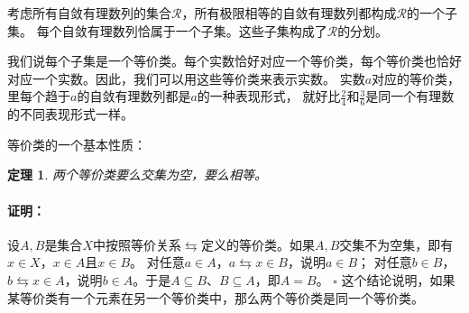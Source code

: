 \documentclass[12pt,UTF8]{ctexbook}
\newtheorem{tm}{定理}[section]
\newenvironment{proof2}{\paragraph{\textbf{证明：}}}{\hfill$\square$}
\begin{document}
\begin{appendix}
考虑所有自敛有理数列的集合$\mathcal{R}$，所有极限相等的自敛有理数列都构成$\mathcal{R}$的一个子集。
每个自敛有理数列恰属于一个子集。这些子集构成了$\mathcal{R}$的分划。

我们说每个子集是一个等价类。每个实数恰好对应一个等价类，每个等价类也恰好对应一个实数。因此，我们可以用这些等价类来表示实数。
实数$a$对应的等价类，里每个趋于$a$的自敛有理数列都是$a$的一种表现形式，
就好比$\frac{2}{4}$和$\frac{3}{6}$是同一个有理数的不同表现形式一样。

等价类的一个基本性质：
\begin{tm}\label{lm:a-1-10}
    两个等价类要么交集为空，要么相等。    
\end{tm}
\begin{proof2}
    设$A,B$是集合$X$中按照等价关系$\leftrightarrows$定义的等价类。如果$A,B$交集不为空集，即有$x\in X$，$x\in A$且$x\in B$。
    对任意$a\in A$，$a\leftrightarrows x\in B$，说明$a\in B$；
    对任意$b\in B$，$b\leftrightarrows x\in A$，说明$b\in A$。于是$A\subseteq B$、$B\subseteq A$，即$A = B$。
\end{proof2}
这个结论说明，如果某等价类有一个元素在另一个等价类中，那么两个等价类是同一个等价类。


\end{appendix}
\end{document}
